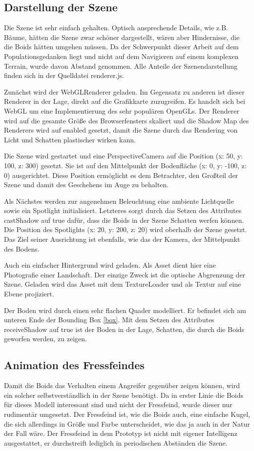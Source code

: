 \documentclass[draft=false
              ,paper=a4
              ,twoside=false
              ,fontsize=11pt
              ,headsepline
              ,BCOR10mm
              ,DIV11
              ,bibtotoc
              ,liststotoc
              ]{scrbook}
\begin{document}
\subsection{Darstellung der Szene}
Die Szene ist sehr einfach gehalten. Optisch ansprechende Details, wie z.B. Bäume, hätten die Szene zwar schöner dargestellt, wären aber Hindernisse, die die Boids hätten umgehen müssen. Da der Schwerpunkt dieser Arbeit auf dem Populationsgedanken liegt und nicht auf dem Navigieren auf einem komplexen Terrain, wurde davon Abstand genommen. Alle Anteile der Szenendarstellung finden sich in der Quelldatei renderer.js.

Zunächst wird der WebGLRenderer geladen. Im Gegensatz zu anderen ist dieser Renderer in der Lage, direkt auf die Grafikkarte zuzugreifen. Es handelt sich bei WebGL um eine Implementierung des sehr populären OpenGLs. Der Renderer wird auf die gesamte Größe des Browserfensters skaliert und die Shadow Map des Renderers wird auf enabled gesetzt, damit die Szene durch das Rendering von Licht und Schatten plastischer wirken kann.

Die Szene wird gestartet und eine PerspectiveCamera auf die Position (x: 50, y: 100, z: 300) gesetzt. Sie ist auf den Mittelpunkt der Bodenfläche (x: 0, y: -100, z: 0) ausgerichtet. Diese Position ermöglicht es dem Betrachter, den Großteil der Szene und damit des Geschehens im Auge zu behalten.

Als Nächstes werden zur angenehmen Beleuchtung eine ambiente Lichtquelle sowie ein Spotlight initialisiert. Letzteres sorgt durch das Setzen des Attributes castShadow auf true dafür, dass die Boids in der Szene Schatten werfen können. Die Position des Spotlights (x: 20, y: 200, z: 20) wird oberhalb der Szene gesetzt. Das Ziel seiner Ausrichtung ist ebenfalls, wie das der Kamera, der Mittelpunkt des Bodens.

Auch ein einfacher Hintergrund wird geladen. Als Asset dient hier eine Photografie einer Landschaft. Der einzige Zweck ist die optische Abgrenzung der Szene. Geladen wird das Asset mit dem TextureLoader und als Textur auf eine Ebene projiziert.

Der Boden wird durch einen sehr flachen Quader modelliert. Er befindet sich am unteren Ende der Bounding Box \ref{box}. Mit dem Setzen des Attributes receiveShadow auf true ist der Boden in der Lage, Schatten, die durch die Boids geworfen werden, zu zeigen.

\subsection{Animation des Fressfeindes}
Damit die Boids das Verhalten einem Angreifer gegenüber zeigen können, wird ein solcher selbstverständlich in der Szene benötigt. Da in erster Linie die Boids für dieses Modell interessant sind und nicht der Fressfeind, wurde dieser nur rudimentär umgesetzt. Der Fressfeind ist, wie die Boids auch, eine einfache Kugel, die sich allerdings in Größe und Farbe unterscheidet, wie das ja auch in der Natur der Fall wäre. Der Fressfeind in dem Prototyp ist nicht mit eigener Intelligenz ausgestattet, er durchstreift lediglich in periodischen Abständen die Szene.
\end{document}
